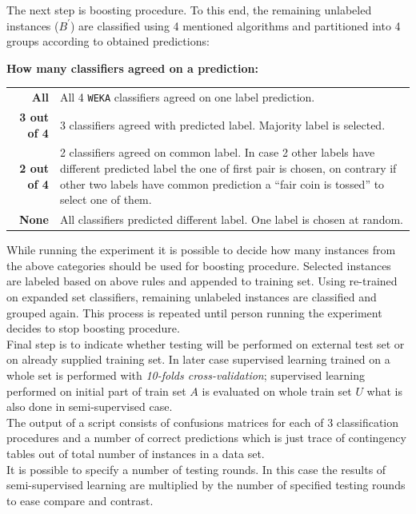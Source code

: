 \documentclass[12pt, a4paper, pdflatex]{report}
\begin{document}
The next step is boosting procedure. To this end, the remaining unlabeled instances ($B^{\prime}$) are classified using 4 mentioned algorithms and partitioned into 4 groups according to obtained predictions:\\[-0.6cm]
\begin{center}\textbf{How many classifiers agreed on a prediction:}\end{center}
\begin{tabular}{rp{12cm}}
\textbf{All} & All 4 \texttt{WEKA} classifiers agreed on one label prediction.\\
\textbf{3 out of 4} & 3 classifiers agreed with predicted label. Majority label is selected.\\
\textbf{2 out of 4} & 2 classifiers agreed on common label. In case 2 other labels have different predicted label the one of first pair is chosen, on contrary if other two labels have common prediction a ``fair coin is tossed'' to select one of them.\\
\textbf{None} & All classifiers predicted different label. One label is chosen at random.\\[0.4cm]
\end{tabular}

While running the experiment it is possible to decide how many instances from the above categories should be used for boosting procedure. Selected instances are labeled based on above rules and appended to training set. Using re-trained on expanded set classifiers, remaining unlabeled instances are classified and grouped again. This process is repeated until person running the experiment decides to stop boosting procedure.\\

Final step is to indicate whether testing will be performed on external test set or on already supplied training set. In later case supervised learning trained on a whole set is performed with \emph{10-folds cross-validation}; supervised learning performed on initial part of train set $A$ is evaluated on whole train set $U$ what is also done in semi-supervised case.\\

The output of a script consists of confusions matrices for each of 3 classification procedures and a number of correct predictions which is just trace of contingency tables out of total number of instances in a data set.\\
It is possible to specify a number of testing rounds. In this case the results of semi-supervised learning are multiplied by the number of specified testing rounds to ease compare and contrast.
\end{document}
